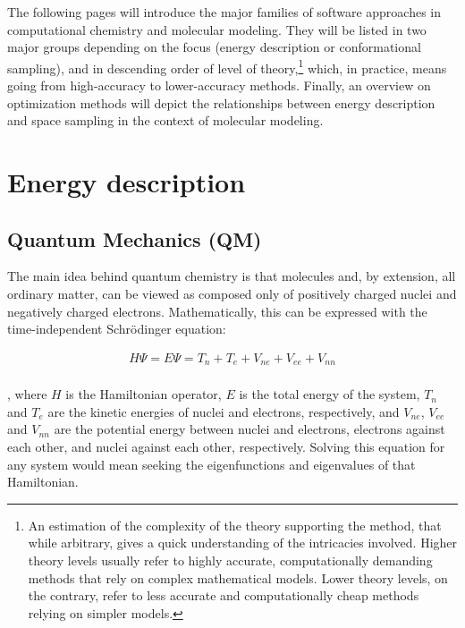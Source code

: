 The following pages will introduce the major families of software approaches in computational chemistry and molecular modeling. They will be listed in two major groups depending on the focus (energy description or conformational sampling), and in descending order of level of theory,\footnote{An estimation of the complexity of the theory supporting the method, that while arbitrary, gives a quick understanding of the intricacies involved. Higher theory levels usually refer to highly accurate, computationally demanding methods that rely on complex mathematical models. Lower theory levels, on the contrary, refer to less accurate and computationally cheap methods relying on simpler models.} which, in practice, means going from high-accuracy to lower-accuracy methods. Finally, an overview on optimization methods will depict the relationships between energy description and space sampling in the context of molecular modeling.


\section{Energy description}
\subsection{Quantum Mechanics (QM)}
\label{section:qm}

The main idea behind quantum chemistry is that molecules and, by extension, all ordinary matter, can be viewed as composed only of positively charged nuclei and negatively charged electrons. Mathematically, this can be expressed with the time-independent Schrödinger equation:

\begin{align}
	H \Psi =E \Psi =T_{n}+T_{e}+V_{ne}+V_{ee}+V_{nn} \\ \tag{Time-independent Schrödinger equation}
\end{align}

, where $H$ is the Hamiltonian operator, $E$ is the total energy of the system, $T_{n}$ and $T_{e}$ are the kinetic energies of nuclei and electrons, respectively, and $V_{ne}$, $V_{ee}$ and $V_{nn}$ are the potential energy between nuclei and electrons, electrons against each other, and nuclei against each other, respectively. Solving this equation for any system would mean seeking the eigenfunctions and eigenvalues of that Hamiltonian.

